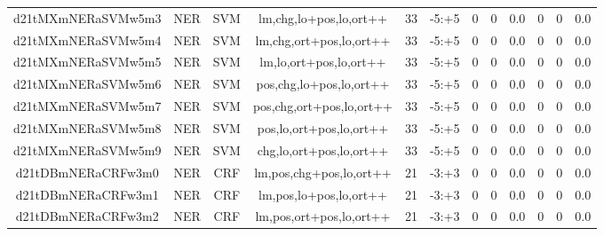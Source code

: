 \documentclass[a4paper]{article}
\begin{document}
\begin{landscape}
\begin{center}
\begin{tabular}{ |c|c|c|c|c|c|c|c|c|c|c|c|}
 
 	
 	\small{ d21tMXmNERaSVMw5m3 } & \small{ NER} & \small{  SVM }  & lm,chg,lo+pos,lo,ort++  &  33 &  \small{  -5:+5 }  &  0 & 0 & 0.0  &  0 & 0 & 0.0 \\
 	

 
 	
 	\small{ d21tMXmNERaSVMw5m4 } & \small{ NER} & \small{  SVM }  & lm,chg,ort+pos,lo,ort++  &  33 &  \small{  -5:+5 }  &  0 & 0 & 0.0  &  0 & 0 & 0.0 \\
 	

 
 	
 	\small{ d21tMXmNERaSVMw5m5 } & \small{ NER} & \small{  SVM }  & lm,lo,ort+pos,lo,ort++  &  33 &  \small{  -5:+5 }  &  0 & 0 & 0.0  &  0 & 0 & 0.0 \\
 	

 
 	
 	\small{ d21tMXmNERaSVMw5m6 } & \small{ NER} & \small{  SVM }  & pos,chg,lo+pos,lo,ort++  &  33 &  \small{  -5:+5 }  &  0 & 0 & 0.0  &  0 & 0 & 0.0 \\
 	

 
 	
 	\small{ d21tMXmNERaSVMw5m7 } & \small{ NER} & \small{  SVM }  & pos,chg,ort+pos,lo,ort++  &  33 &  \small{  -5:+5 }  &  0 & 0 & 0.0  &  0 & 0 & 0.0 \\
 	

 
 	
 	\small{ d21tMXmNERaSVMw5m8 } & \small{ NER} & \small{  SVM }  & pos,lo,ort+pos,lo,ort++  &  33 &  \small{  -5:+5 }  &  0 & 0 & 0.0  &  0 & 0 & 0.0 \\
 	

 
 	
 	\small{ d21tMXmNERaSVMw5m9 } & \small{ NER} & \small{  SVM }  & chg,lo,ort+pos,lo,ort++  &  33 &  \small{  -5:+5 }  &  0 & 0 & 0.0  &  0 & 0 & 0.0 \\
 	

 
 	
 	\small{ d21tDBmNERaCRFw3m0 } & \small{ NER} & \small{  CRF }  & lm,pos,chg+pos,lo,ort++  &  21 &  \small{  -3:+3 }  &  0 & 0 & 0.0  &  0 & 0 & 0.0 \\
 	

 
 	
 	\small{ d21tDBmNERaCRFw3m1 } & \small{ NER} & \small{  CRF }  & lm,pos,lo+pos,lo,ort++  &  21 &  \small{  -3:+3 }  &  0 & 0 & 0.0  &  0 & 0 & 0.0 \\
 	

 
 	
 	\small{ d21tDBmNERaCRFw3m2 } & \small{ NER} & \small{  CRF }  & lm,pos,ort+pos,lo,ort++  &  21 &  \small{  -3:+3 }  &  0 & 0 & 0.0  &  0 & 0 & 0.0 \\
 	


\end{tabular}
\end{center}
\end{landscape}
\end{document}

